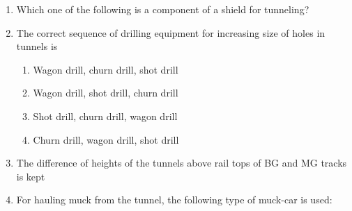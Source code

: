 \documentclass[11pt,a4paper]{article}
\begin{document}
\begin{enumerate}
{Select the correct answer}
\\
\item{Which one of the following is a component of a shield for tunneling?}
\\
\item{The correct sequence of drilling equipment for increasing size of holes in tunnels is}
\begin{enumerate}[label=\Alph*.]
\item{Wagon drill, churn drill, shot drill}
\item{Wagon drill, shot drill, churn drill}
\item{Shot drill, churn drill, wagon drill}
\item{Churn drill, wagon drill, shot drill}
\end{enumerate}
\item{The difference of heights of the tunnels above rail tops of BG and MG tracks is kept}
\\
\item{For hauling muck from the tunnel, the following type of muck-car is used:}
\\
\end{enumerate}
\end{document}
